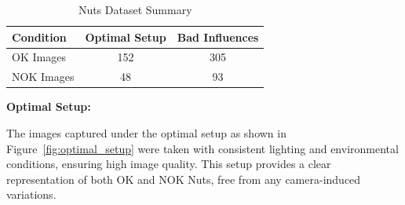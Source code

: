 \documentclass[12pt,DIV14,BCOR12mm,a4paper,footinclude=false,headinclude,parskip=half-,twoside,openright,cleardoublepage=empty,toc=index,bibliography=totoc,listof=totoc]{scrreprt}
\numberwithin{equation}{chapter}
\begin{document}
\begin{table}
    \centering
    \caption{Nuts Dataset Summary}
    \label{tab:nuts-dataset}
    \begin{tabular}{lcc}
        \toprule
        \textbf{Condition} & \textbf{Optimal Setup} & \textbf{Bad Influences} \\ 
        \midrule
        OK Images          & 152                    & 305                     \\ 
        NOK Images         & 48                     & 93                      \\ 
        \bottomrule
    \end{tabular}
\end{table}


\textbf{Optimal Setup:}

The images captured under the optimal setup as shown in Figure~\ref{fig:optimal_setup} were taken with consistent lighting and environmental conditions, ensuring high image quality. This setup provides a clear representation of both OK and NOK Nuts, free from any camera-induced variations.
\end{document}
